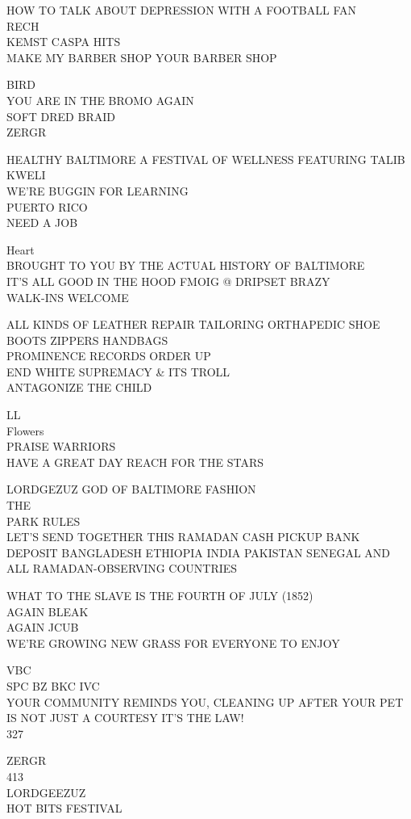 \documentclass[10pt,letterpaper]{article}
\begin{document}
HOW TO TALK ABOUT DEPRESSION WITH A FOOTBALL FAN\\
RECH\\
KEMST CASPA HITS\\
MAKE MY BARBER SHOP YOUR BARBER SHOP

BIRD\\
YOU ARE IN THE BROMO AGAIN\\
SOFT DRED BRAID\\
ZERGR

HEALTHY BALTIMORE A FESTIVAL OF WELLNESS FEATURING TALIB KWELI\\
WE'RE BUGGIN FOR LEARNING\\
PUERTO RICO\\
NEED A JOB

Heart\\
BROUGHT TO YOU BY THE ACTUAL HISTORY OF BALTIMORE\\
IT'S ALL GOOD IN THE HOOD FMOIG @ DRIPSET BRAZY\\
WALK{-}INS WELCOME

ALL KINDS OF LEATHER REPAIR TAILORING ORTHAPEDIC  SHOE BOOTS ZIPPERS HANDBAGS\\
PROMINENCE RECORDS ORDER UP\\
END WHITE SUPREMACY \& ITS TROLL\\
ANTAGONIZE THE CHILD

LL\\
Flowers\\
PRAISE WARRIORS\\
HAVE A GREAT DAY REACH FOR THE STARS

LORDGEZUZ GOD OF BALTIMORE FASHION\\
THE\\
PARK RULES\\
LET'S SEND TOGETHER THIS RAMADAN CASH PICKUP BANK DEPOSIT BANGLADESH ETHIOPIA INDIA PAKISTAN SENEGAL AND ALL RAMADAN{-}OBSERVING COUNTRIES

WHAT TO THE SLAVE IS THE FOURTH OF JULY (1852)\\
AGAIN BLEAK\\
AGAIN JCUB\\
WE'RE GROWING NEW GRASS FOR EVERYONE TO ENJOY

VBC\\
SPC BZ BKC IVC\\
YOUR COMMUNITY REMINDS YOU, CLEANING UP AFTER YOUR PET IS NOT JUST A COURTESY IT'S THE LAW!\\
327

ZERGR\\
413\\
LORDGEEZUZ\\
HOT BITS FESTIVAL
\end{document}
